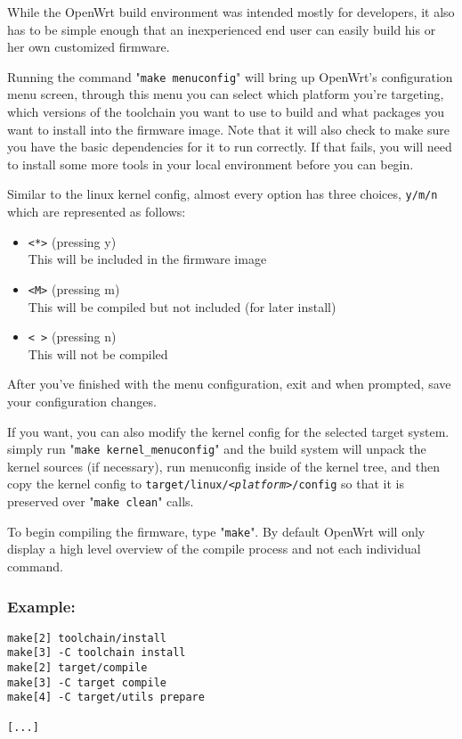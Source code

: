 While the OpenWrt build environment was intended mostly for developers, it also has to be
simple enough that an inexperienced end user can easily build his or her own customized firmware.

Running the command "\texttt{make menuconfig}" will bring up OpenWrt's configuration menu
screen, through this menu you can select which platform you're targeting, which versions of
the toolchain you want to use to build and what packages you want to install into the
firmware image. Note that it will also check to make sure you have the basic dependencies for it
to run correctly.  If that fails, you will need to install some more tools in your local environment
before you can begin.

Similar to the linux kernel config, almost every option has three choices,
\texttt{y/m/n} which are represented as follows:

\begin{itemize}
    \item{\texttt{<*>} (pressing y)} \\
        This will be included in the firmware image
    \item{\texttt{<M>} (pressing m)} \\
        This will be compiled but not included (for later install)
    \item{\texttt{< >} (pressing n)} \\
        This will not be compiled
\end{itemize}

After you've finished with the menu configuration, exit and when prompted, save your
configuration changes.

If you want, you can also modify the kernel config for the selected target system.
simply run "\texttt{make kernel\_menuconfig}" and the build system will unpack the kernel sources
(if necessary), run menuconfig inside of the kernel tree, and then copy the kernel config
to \texttt{target/linux/\textit{<platform>}/config} so that it is preserved over
"\texttt{make clean}" calls.

To begin compiling the firmware, type "\texttt{make}". By default
OpenWrt will only display a high level overview of the compile process and not each individual
command.

\subsubsection{Example:}

\begin{Verbatim}
make[2] toolchain/install
make[3] -C toolchain install
make[2] target/compile
make[3] -C target compile
make[4] -C target/utils prepare

[...]
\end{Verbatim}

